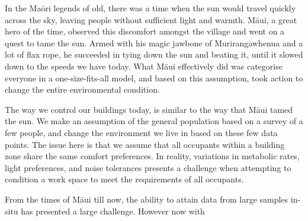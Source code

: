 
In the Ma\={o}ri legends of old, there was a time when the sun would travel quickly across the sky, leaving people without sufficient light and warmth. M\={a}ui, a great hero of the time, observed this discomfort amongst the village and went on a quest to tame the sun. Armed with his magic jawbone of Murirangawhenua and a lot of flax rope, he succeeded in tying down the sun and beating it, until it slowed down to the speeds we have today. What M\={a}ui effectively did was categorise everyone in a one-size-fits-all model, and based on this assumption, took action to change the entire environmental condition. 

The way we control our buildings today, is similar to the way that M\={a}ui tamed the sun. We make an assumption of the general population based on a survey of a few people, and change the environment we live in based on these few data points. The issue here is that we assume that all occupants within a building zone share the same comfort preferences. In reality, variations in metabolic rates, light preferences, and noise tolerances presents a challenge when attempting to condition a work space to meet the requirements of all occupants. 



From the times of M\={a}ui till now, the ability to attain data from large samples in-situ has presented a large challenge. However now with 
















